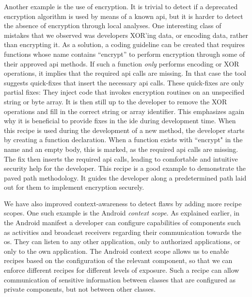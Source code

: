 Another example is the use of encryption.
It is trivial to detect if a deprecated encryption algorithm is used by means of a known \gls{api}, but it is harder to detect the absence of encryption through local analyses.
One interesting class of mistakes that we observed was developers XOR’ing data, or encoding data, rather than encrypting it.
As a solution, a coding guideline can be created that requires functions whose name contains “encrypt” to perform encryption through some of their approved \gls{api} methods.
If such a function \emph{only} performs encoding or XOR operations, it implies that the required \gls{api} calls are missing.
In that case the tool suggests quick-fixes that insert the necessary \gls{api} calls.
These quick-fixes are only partial fixes: They inject code that invokes encryption routines on an unspecified string or byte array.
It is then still up to the developer to remove the XOR operations and fill in the correct string or array identifier.
This emphasizes again why it is beneficial to provide fixes in the \gls{ide} during development time.
When this recipe is used during the development of a new method, the developer starts by creating a function declaration.
When a function exists with ``encrypt" in the name and an empty body, this is marked, as the required \gls{api} calls are missing.
The fix then inserts the required \gls{api} calls, leading to comfortable and intuitive security help for the developer.
This recipe is a good example to demonstrate the paved path methodology.
It guides the developer along a predetermined path laid out for them to implement encryption securely.

We have also improved context-awareness to detect flaws by adding more recipe scopes.
One such example is the Android \emph{context scope}.
As explained earlier, in the Android manifest a developer can configure capabilities of components such as activities and broadcast receivers regarding their communication towards the \gls{os}.
They can listen to any other application, only to authorized applications, or only to the own application.
The Android context scope allows us to enable recipes based on the configuration of the relevant component, so that we can enforce different recipes for different levels of exposure.
Such a recipe can allow communication of sensitive information between classes that are configured as private components, but not between other classes.

